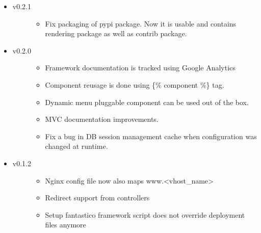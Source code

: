 \documentclass[letterpaper,10pt,english]{sphinxmanual}
\begin{document}
\begin{itemize}
\item {} \begin{description}
\item[{v0.2.1}] \leavevmode\begin{itemize}
\item {} 
Fix packaging of pypi package. Now it is usable and contains rendering package as well as contrib package.

\end{itemize}

\end{description}

\item {} \begin{description}
\item[{v0.2.0}] \leavevmode\begin{itemize}
\item {} 
Framework documentation is tracked using Google Analytics

\item {} 
Component reusage is done using \{\% component \%\} tag.

\item {} 
Dynamic menu pluggable component can be used out of the box.

\item {} 
MVC documentation improvements.

\item {} 
Fix a bug in DB session management cache when configuration was changed at runtime.

\end{itemize}

\end{description}

\item {} \begin{description}
\item[{v0.1.2}] \leavevmode\begin{itemize}
\item {} 
Nginx config file now also maps www.\textless{}vhost\_name\textgreater{}

\item {} 
Redirect support from controllers

\item {} 
Setup fantastico framework script does not override deployment files anymore

\end{itemize}

\end{description}


\end{itemize}
\end{document}
